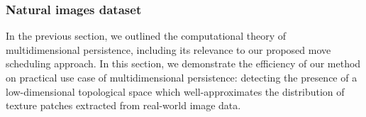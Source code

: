 \documentclass{article} %
\begin{document}



 
 \subsubsection*{Natural images dataset} 
 In the previous section, we outlined the computational theory of multidimensional persistence, including its relevance to our proposed move scheduling approach. In this section, we demonstrate the efficiency of our method on practical use case of multidimensional persistence: detecting the presence of a low-dimensional topological space which well-approximates the distribution of texture patches extracted from real-world image data. 
 
\end{document}
